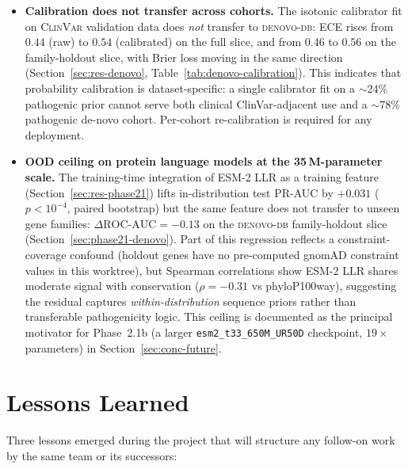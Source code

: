 \documentclass[11pt,a4paper,oneside]{report}
\begin{document}
\begin{itemize}[leftmargin=1.8em, itemsep=0.2em]
  contributor to the pre-constraint generalisation gap
  reported in Section~\ref{sec:res-denovo}, and is flagged
  here for completeness.
\item \textbf{Calibration does not transfer across
  cohorts.} The isotonic calibrator fit on
  \textsc{ClinVar} validation data does \emph{not} transfer
  to \textsc{denovo-db}: ECE rises from $0.44$ (raw) to
  $0.54$ (calibrated) on the full slice, and from $0.46$
  to $0.56$ on the family-holdout slice, with Brier loss
  moving in the same direction
  (Section~\ref{sec:res-denovo},
  Table~\ref{tab:denovo-calibration}). This indicates
  that probability calibration is dataset-specific: a
  single calibrator fit on a $\sim$24\% pathogenic prior
  cannot serve both clinical ClinVar-adjacent use and
  a $\sim$78\% pathogenic de-novo cohort. Per-cohort
  re-calibration is required for any deployment.
\item \textbf{OOD ceiling on protein language models at the
  35\,M-parameter scale.} The training-time integration of
  ESM-2 LLR as a training feature
  (Section~\ref{sec:res-phase21}) lifts in-distribution
  test PR-AUC by $+0.031$ ($p<10^{-4}$, paired bootstrap)
  but the same feature does not transfer to unseen gene
  families: $\Delta\text{ROC-AUC}=-0.13$ on the
  \textsc{denovo-db} family-holdout slice
  (Section~\ref{sec:phase21-denovo}). Part of this
  regression reflects a constraint-coverage confound
  (holdout genes have no pre-computed gnomAD constraint
  values in this worktree), but Spearman correlations
  show ESM-2 LLR shares moderate signal with conservation
  ($\rho=-0.31$ vs phyloP100way), suggesting the residual
  captures \emph{within-distribution} sequence priors
  rather than transferable pathogenicity logic. This
  ceiling is documented as the principal motivator for
  Phase~2.1b (a larger \texttt{esm2\_t33\_650M\_UR50D}
  checkpoint, $19\times$ parameters) in
  Section~\ref{sec:conc-future}.
\end{itemize}

\section{Lessons Learned}
\label{sec:conc-lessons}

Three lessons emerged during the project that will
structure any follow-on work by the same team or its
successors:
\end{document}

